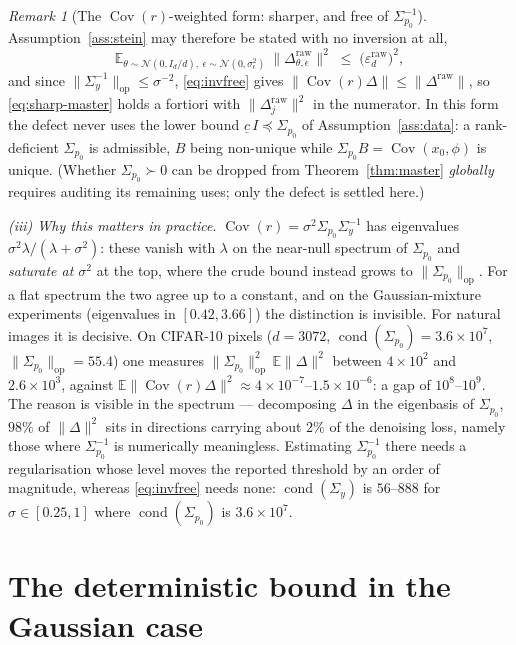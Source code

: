 \documentclass[11pt]{article}
\theoremstyle{remark}
\newtheorem{remark}{Remark}
\newcommand{\E}{\mathbb{E}}
\newcommand{\Cov}{\operatorname{Cov}}
\newcommand{\Sig}{\Sigma_{p_0}}
\newcommand{\Sy}{\Sigma_y}
\newcommand{\op}[1]{\lVert #1 \rVert_{\mathrm{op}}}
\begin{document}
\begin{remark}[The $\Cov(r)$-weighted form: sharper, and free of $\Sig^{-1}$]
Assumption~\ref{ass:stein} may therefore be stated with no inversion at all,
\[
\E_{\theta \sim \mathcal N(0,I_d/d),\ \epsilon\sim\mathcal N(0,\sigma_\epsilon^2)}\ \big\lVert \Delta^{\mathrm{raw}}_{\theta,\epsilon}\big\rVert^2 \;\le\; \big(\varepsilon^{\mathrm{raw}}_d\big)^2 ,
\]
and since $\op{\Sy^{-1}} \le \sigma^{-2}$, \eqref{eq:invfree} gives $\lVert\Cov(r)\Delta\rVert \le \lVert\Delta^{\mathrm{raw}}\rVert$, so \eqref{eq:sharp-master} holds a fortiori with $\lVert\Delta^{\mathrm{raw}}_j\rVert^2$ in the numerator. In this form the defect never uses the lower bound $\underline c\,I \preceq \Sig$ of Assumption~\ref{ass:data}: a rank-deficient $\Sig$ is admissible, $B$ being non-unique while $\Sig B = \Cov(x_0,\phi)$ is unique. (Whether $\Sig \succ 0$ can be dropped from Theorem~\ref{thm:master} \emph{globally} requires auditing its remaining uses; only the defect is settled here.)

\emph{(iii) Why this matters in practice.} $\Cov(r) = \sigma^2\Sig\Sy^{-1}$ has eigenvalues $\sigma^2\lambda/(\lambda+\sigma^2)$: these vanish with $\lambda$ on the near-null spectrum of $\Sig$ and \emph{saturate at $\sigma^2$} at the top, where the crude bound instead grows to $\op{\Sig}$. For a flat spectrum the two agree up to a constant, and on the Gaussian-mixture experiments (eigenvalues in $[0.42,3.66]$) the distinction is invisible. For natural images it is decisive. On CIFAR-10 pixels ($d=3072$, $\operatorname{cond}(\Sig)=3.6\times10^{7}$, $\op{\Sig}=55.4$) one measures $\op{\Sig}^2\,\E\lVert\Delta\rVert^2$ between $4\times10^{2}$ and $2.6\times10^{3}$, against $\E\lVert\Cov(r)\Delta\rVert^2 \approx 4\times10^{-7}$--$1.5\times10^{-6}$: a gap of $10^{8}$--$10^{9}$. The reason is visible in the spectrum --- decomposing $\Delta$ in the eigenbasis of $\Sig$, $98\%$ of $\lVert\Delta\rVert^2$ sits in directions carrying about $2\%$ of the denoising loss, namely those where $\Sig^{-1}$ is numerically meaningless. Estimating $\Sig^{-1}$ there needs a regularisation whose level moves the reported threshold by an order of magnitude, whereas \eqref{eq:invfree} needs none: $\operatorname{cond}(\Sy)$ is $56$--$888$ for $\sigma\in[0.25,1]$ where $\operatorname{cond}(\Sig)$ is $3.6\times10^{7}$.
\end{remark}

\section{The deterministic bound in the Gaussian case}\label{sec:gauss}
\end{document}
